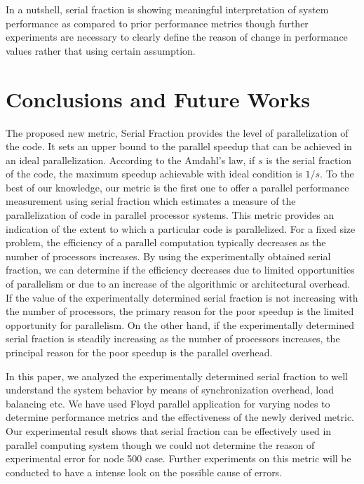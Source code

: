 In a nutshell, serial fraction is showing meaningful interpretation of system performance as compared to prior performance metrics though further experiments are necessary to clearly define the reason of change in performance values rather that using certain assumption.

\section{Conclusions and Future Works}
The proposed new metric, Serial Fraction provides the level of parallelization of the code. It sets an upper bound
to the parallel speedup that can be achieved in an ideal parallelization. According to the Amdahl's law, if $s$ is the serial fraction of the code, the maximum speedup achievable with ideal condition is $1/s$. To the best of our knowledge, our metric is the first one to offer a parallel performance measurement using serial fraction which estimates a measure of the parallelization of code in parallel processor systems. This metric provides
an indication of the extent to which a particular code is  parallelized. For a fixed size problem, the efficiency of a parallel computation typically decreases as the number of processors increases. By using the experimentally obtained serial fraction, we can determine if the efficiency decreases due to limited opportunities of parallelism or due to an increase of the algorithmic or architectural overhead. If the value of
the experimentally determined serial fraction is not increasing
with the number of processors, the primary reason for the
poor speedup is the limited opportunity for parallelism. On the
other hand, if the experimentally determined serial fraction is
steadily increasing as the number of processors increases, the
principal reason for the poor speedup is the parallel overhead.

In this paper, we analyzed the experimentally determined serial
fraction to well understand the system behavior by means of
synchronization overhead, load balancing etc. We have used
Floyd parallel application for varying nodes to determine
performance metrics and the effectiveness of the newly derived
metric. Our experimental result shows that serial fraction can
be effectively used in parallel computing system though we
could not determine the reason of experimental error for node
500 case. Further experiments on this metric will be conducted
to have a intense look on the possible cause of errors.







